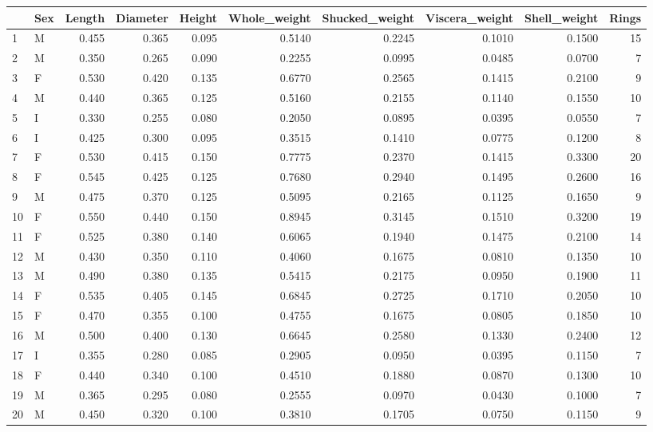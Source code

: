 \documentclass[9pt,twocolumn,twoside,]{pnas-new}
\begin{document}
\begin{tabular}{l|l|r|r|r|r|r|r|r|r}
\hline
  & Sex & Length & Diameter & Height & Whole\_weight & Shucked\_weight & Viscera\_weight & Shell\_weight & Rings\\
\hline
1 & M & 0.455 & 0.365 & 0.095 & 0.5140 & 0.2245 & 0.1010 & 0.1500 & 15\\
\hline
2 & M & 0.350 & 0.265 & 0.090 & 0.2255 & 0.0995 & 0.0485 & 0.0700 & 7\\
\hline
3 & F & 0.530 & 0.420 & 0.135 & 0.6770 & 0.2565 & 0.1415 & 0.2100 & 9\\
\hline
4 & M & 0.440 & 0.365 & 0.125 & 0.5160 & 0.2155 & 0.1140 & 0.1550 & 10\\
\hline
5 & I & 0.330 & 0.255 & 0.080 & 0.2050 & 0.0895 & 0.0395 & 0.0550 & 7\\
\hline
6 & I & 0.425 & 0.300 & 0.095 & 0.3515 & 0.1410 & 0.0775 & 0.1200 & 8\\
\hline
7 & F & 0.530 & 0.415 & 0.150 & 0.7775 & 0.2370 & 0.1415 & 0.3300 & 20\\
\hline
8 & F & 0.545 & 0.425 & 0.125 & 0.7680 & 0.2940 & 0.1495 & 0.2600 & 16\\
\hline
9 & M & 0.475 & 0.370 & 0.125 & 0.5095 & 0.2165 & 0.1125 & 0.1650 & 9\\
\hline
10 & F & 0.550 & 0.440 & 0.150 & 0.8945 & 0.3145 & 0.1510 & 0.3200 & 19\\
\hline
11 & F & 0.525 & 0.380 & 0.140 & 0.6065 & 0.1940 & 0.1475 & 0.2100 & 14\\
\hline
12 & M & 0.430 & 0.350 & 0.110 & 0.4060 & 0.1675 & 0.0810 & 0.1350 & 10\\
\hline
13 & M & 0.490 & 0.380 & 0.135 & 0.5415 & 0.2175 & 0.0950 & 0.1900 & 11\\
\hline
14 & F & 0.535 & 0.405 & 0.145 & 0.6845 & 0.2725 & 0.1710 & 0.2050 & 10\\
\hline
15 & F & 0.470 & 0.355 & 0.100 & 0.4755 & 0.1675 & 0.0805 & 0.1850 & 10\\
\hline
16 & M & 0.500 & 0.400 & 0.130 & 0.6645 & 0.2580 & 0.1330 & 0.2400 & 12\\
\hline
17 & I & 0.355 & 0.280 & 0.085 & 0.2905 & 0.0950 & 0.0395 & 0.1150 & 7\\
\hline
18 & F & 0.440 & 0.340 & 0.100 & 0.4510 & 0.1880 & 0.0870 & 0.1300 & 10\\
\hline
19 & M & 0.365 & 0.295 & 0.080 & 0.2555 & 0.0970 & 0.0430 & 0.1000 & 7\\
\hline
20 & M & 0.450 & 0.320 & 0.100 & 0.3810 & 0.1705 & 0.0750 & 0.1150 & 9\\

\end{tabular}
\end{document}
